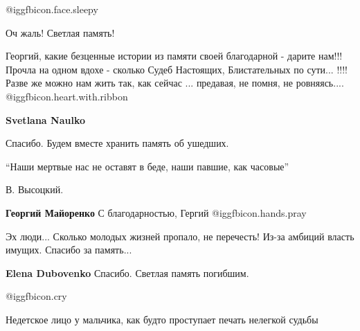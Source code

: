 \begin{itemize}
 @igg{fbicon.face.sleepy} 

Оч жаль! Светлая память!


Георгий, какие безценные истории из памяти своей благодарной - дарите нам!!!
Прочла на одном вдохе - сколько Судеб Настоящих, Блистательных по сути... !!!!
Разве же можно нам жить так, как сейчас ... предавая, не помня, не ровняясь....  @igg{fbicon.heart.with.ribbon} 

\begin{itemize} %
\textbf{Svetlana Naulko} 

Спасибо. Будем вместе хранить память об ушедших.

\enquote{Наши мертвые нас не оставят в беде,
наши павшие, как часовые}

В. Высоцкий.

\textbf{Георгий Майоренко} С благодарностью, Гергий @igg{fbicon.hands.pray} 
\end{itemize} %

Эх люди... Сколько молодых жизней пропало, не перечесть! Из-за амбиций власть имущих.
Спасибо за память...

\textbf{Elena Dubovenko} Спасибо. Светлая память погибшим.

 @igg{fbicon.cry} 

Недетское лицо у мальчика, как будто проступает печать нелегкой судьбы

\end{itemize} %
